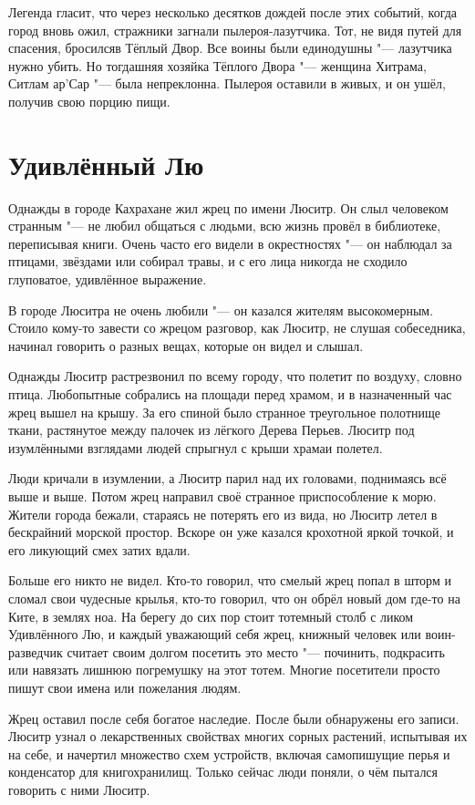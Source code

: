 Легенда гласит, что через несколько десятков дождей после этих событий, когда город вновь ожил, стражники загнали пылероя-лазутчика.
Тот, не видя путей для спасения, бросился\ldotst в Тёплый Двор.
Все воины были единодушны "--- лазутчика нужно убить. Но тогдашняя хозяйка Тёплого Двора "--- женщина Хитрама, Ситлам ар’Сар "--- была непреклонна.
Пылероя оставили в живых, и он ушёл, получив свою порцию пищи.

\section{Удивлённый Лю}

Однажды в городе Кахрахане жил жрец по имени Люситр.
Он слыл человеком странным "--- не любил общаться с людьми, всю жизнь провёл в библиотеке, переписывая книги.
Очень часто его видели в окрестностях "--- он наблюдал за птицами, звёздами или собирал травы, и с его лица никогда не сходило глуповатое, удивлённое выражение.

В городе Люситра не очень любили "--- он казался жителям высокомерным.
Стоило кому-то завести со жрецом разговор, как Люситр, не слушая собеседника, начинал говорить о разных вещах, которые он видел и слышал.

Однажды Люситр растрезвонил по всему городу, что полетит по воздуху, словно птица.
Любопытные собрались на площади перед храмом, и в назначенный час жрец вышел на крышу.
За его спиной было странное треугольное полотнище ткани, растянутое между палочек из лёгкого Дерева Перьев.
Люситр под изумлёнными взглядами людей спрыгнул с крыши храма\ldotst и полетел.

Люди кричали в изумлении, а Люситр парил над их головами, поднимаясь всё выше и выше.
Потом жрец направил своё странное приспособление к морю.
Жители города бежали, стараясь не потерять его из вида, но Люситр летел в бескрайний морской простор.
Вскоре он уже казался крохотной яркой точкой, и его ликующий смех затих вдали.

Больше его никто не видел.
Кто-то говорил, что смелый жрец попал в шторм и сломал свои чудесные крылья, кто-то говорил, что он обрёл новый дом где-то на Ките, в землях ноа.
На берегу до сих пор стоит тотемный столб с ликом Удивлённого Лю, и каждый уважающий себя жрец, книжный человек или воин-разведчик считает своим долгом посетить это место "--- починить, подкрасить или навязать лишнюю погремушку на этот тотем.
Многие посетители просто пишут свои имена или пожелания людям.

Жрец оставил после себя богатое наследие.
После были обнаружены его записи.
Люситр узнал о лекарственных свойствах многих сорных растений, испытывая их на себе, и начертил множество схем устройств, включая самопишущие перья и конденсатор для книгохранилищ.
Только сейчас люди поняли, о чём пытался говорить с ними Люситр.

